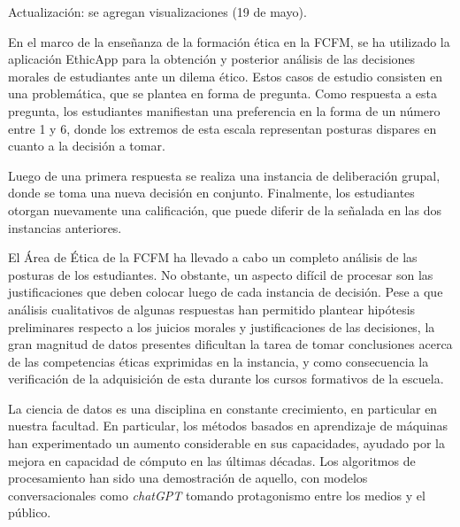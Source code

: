 \documentclass[
	spanish, %
	letterpaper, oneside
]{article}
\begin{document}
	
\templatePagecfg

\templateFinalcfg


\inserttitle

Actualización: se agregan visualizaciones (19 de mayo).


En el marco de la enseñanza de la formación ética en la FCFM, se ha utilizado la aplicación EthicApp para la obtención y posterior análisis de las decisiones morales de estudiantes ante un dilema ético. Estos casos de estudio consisten en una problemática, que se plantea en forma de pregunta. Como respuesta a esta pregunta, los estudiantes manifiestan una preferencia en la forma de un número entre 1 y 6, donde los extremos de esta escala representan posturas dispares en cuanto a la decisión a tomar.


Luego de una primera respuesta se realiza una instancia de deliberación grupal, donde se toma una nueva decisión en conjunto. Finalmente, los estudiantes otorgan nuevamente una calificación, que puede diferir de la señalada en las dos instancias anteriores.


\newp El Área de Ética de la FCFM ha llevado a cabo un completo análisis de las posturas de los estudiantes. No obstante, un aspecto difícil de procesar son las justificaciones que deben colocar luego de cada instancia de decisión. Pese a que análisis cualitativos de algunas respuestas han permitido plantear hipótesis preliminares respecto a los juicios morales y justificaciones de las decisiones, la gran magnitud de datos presentes dificultan la tarea de tomar conclusiones acerca de las competencias éticas exprimidas en la instancia, y como consecuencia la verificación de la adquisición de esta durante los cursos formativos de la escuela.



La ciencia de datos es una disciplina en constante crecimiento, en particular en nuestra facultad. En particular, los métodos basados en aprendizaje de máquinas han experimentado un aumento considerable en sus capacidades, ayudado por la mejora en capacidad de cómputo en las últimas décadas. Los algoritmos de procesamiento han sido una demostración de aquello, con modelos conversacionales como \textit{chatGPT} tomando protagonismo entre los medios y el público. 
\end{document}
